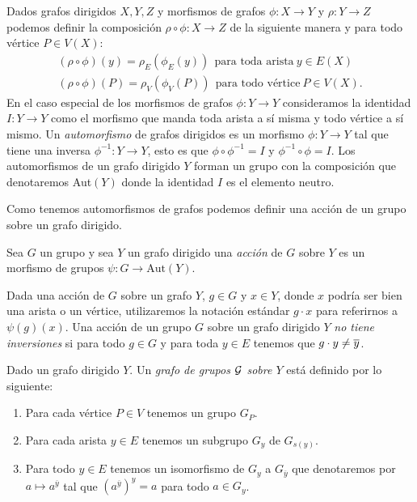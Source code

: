 \documentclass[tesis.tex]{subfiles}
\begin{document}
Dados grafos dirigidos $X,Y,Z$ y morfismos de grafos $\phi:X \to Y$ y $\rho:Y \to Z$ podemos definir la composición $\rho \circ \phi : X \to Z$ de la siguiente manera  y para todo vértice $P \in V(X)$:
\begin{align*}
	(\rho \circ \phi) (y) = \rho_{E} (\phi_{E} (y)) \  \ \text{para toda arista} \ y \in E(X) \\
	(\rho \circ \phi) (P) = \rho_{V} (\phi_{V} (P)) \  \ \text{para todo vértice} \ P \in V(X). 
\end{align*}
En el caso especial de los morfismos de grafos $\phi: Y \to Y$ consideramos la identidad $I: Y \to Y$ como el morfismo que manda toda arista a sí misma y todo vértice a sí mismo.
Un \emph{automorfismo} de grafos dirigidos es un morfismo $\phi:Y \to Y$ tal que tiene una inversa $\phi^{-1}:Y \to Y$, esto es que $\phi \circ \phi^{-1} = I$ y $\phi^{-1} \circ \phi = I$.
Los automorfismos de un grafo dirigido $Y$ forman un grupo con la composición que denotaremos Aut$(Y)$ donde la identidad $I$ es el elemento neutro.

Como tenemos automorfismos de grafos podemos definir una acción de un grupo sobre un grafo dirigido.
\begin{deff}
	Sea $G$ un grupo y sea $Y$ un grafo dirigido una \emph{acción} de $G$ sobre $Y$ es un morfismo de grupos $\psi: G \to \text{Aut}(Y)$.
	
\end{deff}

Dada una acción de $G$ sobre un grafo $Y$, $g \in G$ y $x \in Y$, donde $x$ podría ser bien una arista o un vértice, utilizaremos la notación estándar $g \cdot x$ para referirnos a $\psi(g)(x)$.
Una acción de un grupo $G$ sobre un grafo dirigido $Y$ \emph{no tiene inversiones} si para todo $g \in G$ y para toda $y \in E$ tenemos que $g \cdot y \neq \overline y$.

\begin{deff}
	Dado un grafo dirigido $Y$.
	Un \emph{grafo de grupos $\cal G$ sobre $Y$} está definido por lo siguiente:
	\begin{enumerate}
		\item Para cada vértice $P \in V$ tenemos un grupo $G_P$.
		\item  Para cada arista $y \in E$ tenemos un subgrupo $G_y$ de $G_{s(y)}$.
		\item Para todo $y \in E$ tenemos un isomorfismo de $G_y$ a $G_{\overline y}$ que denotaremos por $a \mapsto a^{\overline y} $ tal que $(a^{\overline y})^y  = a$ para todo $a \in G_y$.
	\end{enumerate}
\end{deff}
\end{document}
